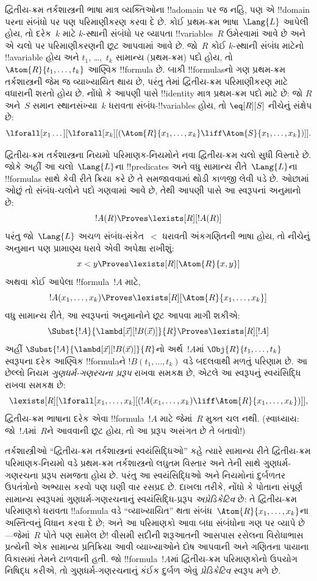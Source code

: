 \documentclass[../../../include/open-logic-section]{subfiles}
\begin{document}


દ્વિતીય-ક્રમ તર્કશાસ્ત્રની ભાષા માત્ર વ્યક્તિઓના !!a{domain} પર જ નહિ,
પણ એ !!{domain} પરના સંબંધો પર પણ પરિમાણીકરણ કરવા દે છે. કોઈ
પ્રથમ-ક્રમ ભાષા~$\Lang{L}$ આપેલી હોય, તો દરેક~$k$ માટે $k$-સ્થાની
સંબંધો પર વ્યાપતા !!{variable}s~$R$ ઉમેરવામાં આવે છે અને એ ચલો પર
પરિમાણીકરણની છૂટ આપવામાં આવે છે. જો~$R$ કોઈ $k$-સ્થાની સંબંધ માટેનો
!!a{variable} હોય અને $t_1$, \dots,~$t_k$ સામાન્ય (પ્રથમ-ક્રમ) પદો હોય,
તો $\Atom{R}{t_1,\dots,t_k}$ આણ્વિક !!{formula} છે. બાકી !!{formula}sનો
ગણ પ્રથમ-ક્રમ તર્કશાસ્ત્રની જેમ જ વ્યાખ્યાયિત થાય છે, પરંતુ તેમાં
દ્વિતીય-ક્રમ પરિમાણીકરણ માટે વધારાની શરતો હોય છે. નોંધો કે આપણી પાસે
!!{identity} માત્ર પ્રથમ-ક્રમ પદો માટે છે: જો $R$ અને~$S$ સમાન
સ્થાનસંખ્યા~$k$ ધરાવતા સંબંધ-!!{variable}s હોય, તો $\eq[R][S]$ નીચેનું
સંક્ષેપ છે:
\[
\lforall[x_1 \dots][\lforall[x_k][(\Atom{R}{x_1, \dots, x_k} \liff
  \Atom{S}{x_1, \dots, x_k})]].
\]

દ્વિતીય-ક્રમ તર્કશાસ્ત્રના નિયમો પરિમાણક-નિયમોને નવા દ્વિતીય-ક્રમ
ચલો સુધી વિસ્તારે છે. જોકે અહીં આ ચલો~$\Lang{L}$ના !!{predicate}s અને
વધુ સામાન્ય રીતે~$\Lang{L}$ના !!{formula}s સાથે કેવી રીતે ક્રિયા કરે
છે તે સમજાવવામાં થોડી કાળજી લેવી પડે છે. ઓછામાં ઓછું તો સંબંધ-ચલોને
પદો ગણવામાં આવે છે, તેથી આપણી પાસે આ સ્વરૂપનાં અનુમાનો છે:
\[
!A(R) \Proves \lexists[R][!A(R)]
\]
પરંતુ જો~$\Lang{L}$ અચળ સંબંધ-સંકેત~$<$ ધરાવતી અંકગણિતની ભાષા હોય,
તો નીચેનું અનુમાન પણ પ્રામાણ્ય ધરાવે એવી અપેક્ષા રાખીશું:
\[
x < y \Proves \lexists[R][\Atom{R}{x,y}]
\]
અથવા કોઈ આપેલા !!{formula}~$!A$ માટે,
\[
!A(x_1, \dots, x_k) \Proves \lexists[R][\Atom{R}{x_1,\dots,x_k}]
\]
વધુ સામાન્ય રીતે, આ સ્વરૂપનાં અનુમાનોને છૂટ આપવા માગી શકીએ:
\[
\Subst{!A}{\lambd[\vec x][!B(\vec x)]}{R} \Proves
\lexists[R][!A]
\]
અહીં $\Subst{!A}{\lambd[\vec x][!B(\vec x)]}{R}$નો અર્થ~$!A$માં
$\Obj{R}{t_1,\dots,t_k}$ સ્વરૂપના દરેક આણ્વિક !!{formula}ને
$!B(t_1, \dots, t_k)$ વડે બદલવાથી મળતું પરિણામ છે. આ છેલ્લો નિયમ
\emph{ગુણધર્મ-ગણરચના પ્રરૂપ} રાખવા સમકક્ષ છે, એટલે આ સ્વરૂપનું
સ્વયંસિદ્ધિ રાખવા સમકક્ષ છે:
\[
\lexists[R][\lforall[x_1, \dots, x_k][(!A(x_1, \dots, x_k) \liff
\Atom{R}{x_1, \dots, x_k})]],
\]
દ્વિતીય-ક્રમ ભાષાના દરેક એવા !!{formula}~$!A$ માટે જેમાં~$R$ મુક્ત
ચલ નથી.
(સ્વાધ્યાય: જો~$!A$માં~$R$ને આવવાની છૂટ હોય, તો આ પ્રરૂપ અસંગત છે તે
બતાવો!)

તર્કશાસ્ત્રીઓ ``દ્વિતીય-ક્રમ તર્કશાસ્ત્રનાં સ્વયંસિદ્ધિઓ'' કહે ત્યારે
સામાન્ય રીતે દ્વિતીય-ક્રમ પરિમાણક-નિયમો વડે પ્રથમ-ક્રમ તર્કશાસ્ત્રનો
લઘુતમ વિસ્તાર અને તેની સાથે ગુણધર્મ-ગણરચના પ્રરૂપ સમજતા હોય છે. પરંતુ
આ સ્વયંસિદ્ધિઓ અને નિયમોનાં દુર્બળતર ઉપતંત્રોનો અભ્યાસ કરવો પણ ઘણી વાર
રસપ્રદ છે. દાખલા તરીકે, નોંધો કે પોતાના સંપૂર્ણ સામાન્ય સ્વરૂપમાં
ગુણધર્મ-ગણરચનાનું સ્વયંસિદ્ધિ-પ્રરૂપ \emph{અપ્રેડિકેટિવ} છે: તે
દ્વિતીય-ક્રમ પરિમાણકો ધરાવતા !!a{formula} વડે ``વ્યાખ્યાયિત'' થતા
સંબંધ~$\Atom{R}{x_1, \dots, x_k}$ના અસ્તિત્વનું વિધાન કરવા દે છે; અને
આ પરિમાણકો આવા બધા સંબંધોના ગણ પર વ્યાપે છે---જેમાં~$R$ પોતે પણ સામેલ
છે!{} વીસમી સદીની શરૂઆતની આસપાસ રસેલના વિરોધાભાસ પ્રત્યેની એક સામાન્ય
પ્રતિક્રિયા આવી વ્યાખ્યાઓને દોષ આપવાની અને ગણિતના પાયાના વિકાસમાં તેમને
ટાળવાની હતી. જો !!{formula}~$!A$માં દ્વિતીય-ક્રમ પરિમાણકોનો ઉપયોગ
નિષિદ્ધ કરીએ, તો ગુણધર્મ-ગણરચનાનું કંઈક દુર્બળ એવું
\emph{પ્રેડિકેટિવ} સ્વરૂપ મળે છે.
\end{document}
